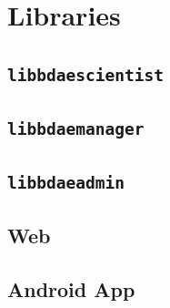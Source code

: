 \section{Libraries}
\subsection{\texttt{libbdaescientist}}
\subsection{\texttt{libbdaemanager}}
\subsection{\texttt{libbdaeadmin}}
\subsection{Web}
\subsection{Android App} \label{sec:bdaeapp}